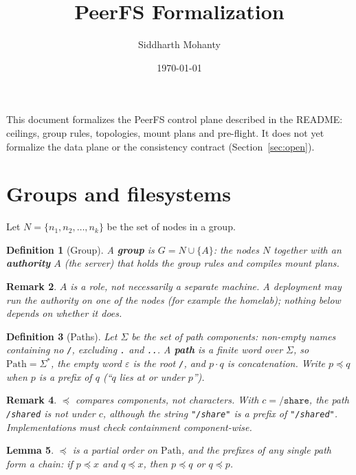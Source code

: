 \documentclass[11pt]{article}
\title{PeerFS Formalization}
\author{Siddharth Mohanty}
\date{\today}
\newcommand{\Path}{\text{Path}}
\theoremstyle{definitionbreak}
\newtheorem{definition}{Definition}[section]
\theoremstyle{plainbreak}
\newtheorem{lemma}[definition]{Lemma}
\theoremstyle{remarkbreak}
\newtheorem{remark}[definition]{Remark}
\begin{document}
\maketitle

This document formalizes the PeerFS control plane described in the README: ceilings, group
rules, topologies, mount plans and pre-flight. It does not yet formalize the data plane or the
consistency contract (Section~\ref{sec:open}).

\section{Groups and filesystems}

Let $N = \{n_1, n_2, \dots, n_k\}$ be the set of nodes in a group.

\begin{definition}[Group]
A \textbf{group} is $G = N \cup \{A\}$: the nodes $N$ together with an \textbf{authority} $A$
(the server) that holds the group rules and compiles mount plans.
\end{definition}

\begin{remark}
$A$ is a role, not necessarily a separate machine. A deployment may run the authority on one of
the nodes (for example the homelab); nothing below depends on whether it does.
\end{remark}

\begin{definition}[Paths]
Let $\Sigma$ be the set of path \emph{components}: non-empty names containing no \texttt{/},
excluding \texttt{.} and \texttt{..}. A \textbf{path} is a finite word over $\Sigma$, so
$\Path = \Sigma^*$, the empty word $\varepsilon$ is the root \texttt{/}, and $p \cdot q$ is
concatenation. Write $p \preceq q$ when $p$ is a prefix of $q$ (``$q$ lies at or under $p$'').
\end{definition}

\begin{remark}
$\preceq$ compares components, not characters. With $c = \texttt{/share}$, the path
\texttt{/shared} is \emph{not} under $c$, although the string \texttt{"/share"} is a prefix of
\texttt{"/shared"}. Implementations must check containment component-wise.
\end{remark}

\begin{lemma}\label{lem:prefix-chain}
$\preceq$ is a partial order on $\Path$, and the prefixes of any single path form a chain: if
$p \preceq x$ and $q \preceq x$, then $p \preceq q$ or $q \preceq p$.
\end{lemma}
\end{document}
